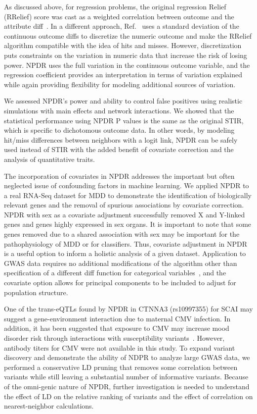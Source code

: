 \documentclass[10pt]{article}
\begin{document}
As discussed above, for regression problems, the original regression Relief (RRelief) score was cast as a weighted correlation between outcome and the attribute diff~\cite{robnik03}.
In a different approach, Ref.~\cite{urbanowicz17} uses a standard deviation of the continuous outcome diffs to discretize the numeric outcome and make the RRelief algorithm compatible with the idea of hits and misses.
However, discretization puts constraints on the variation in numeric data that increase the risk of losing power.
NPDR uses the full variation in the continuous outcome variable, and the regression coefficient provides an interpretation in terms of variation explained while again providing flexibility for modeling additional sources of variation.

We assessed NPDR's power and ability to control false positives using realistic simulations with main effects and network interactions.
We showed that the statistical performance using NPDR P values is the same as the original STIR, which is specific to dichotomous outcome data.
In other words, by modeling hit/miss differences between neighbors with a logit link, NPDR can be safely used instead of STIR with the added benefit of covariate correction and the analysis of quantitative traits.

The incorporation of covariates in NPDR addresses the important but often neglected issue of confounding factors in machine learning.
We applied NPDR to a real RNA-Seq dataset for MDD to demonstrate the identification of biologically relevant genes and the removal of spurious associations by covariate correction.
NPDR with sex as a covariate adjustment successfully removed X and Y-linked genes and genes highly expressed in sex organs.
It is important to note that some genes removed due to a shared association with sex may be important for the pathophysiology of MDD or for classifiers.
Thus, covariate adjustment in NPDR is a useful option to inform a holistic analysis of a given dataset.
Application to GWAS data requires no additional modifications of the algorithm other than specification of a different diff function for categorical variables~\cite{titv}, and the covariate option allows for principal components to be included to adjust for population structure.

One of the trans-eQTLs found by NPDR in CTNNA3 (rs10997355) for SCAI may suggest a gene-environment interaction due to maternal CMV infection.
In addition, it has been suggested that exposure to CMV may increase mood disorder risk through interactions with susceptibility variants~\cite{kim2007exposure}.
However, antibody titers for CMV were not available in this study.
To expand variant discovery and demonstrate the ability of NDPR to analyze large GWAS data, we performed a conservative LD pruning that removes some correlation between variants while still leaving a substantial number of informative variants.
Because of the omni-genic nature of NPDR, further investigation is needed to understand the effect of LD on the relative ranking of variants and the effect of correlation on nearest-neighbor calculations.
\end{document}

